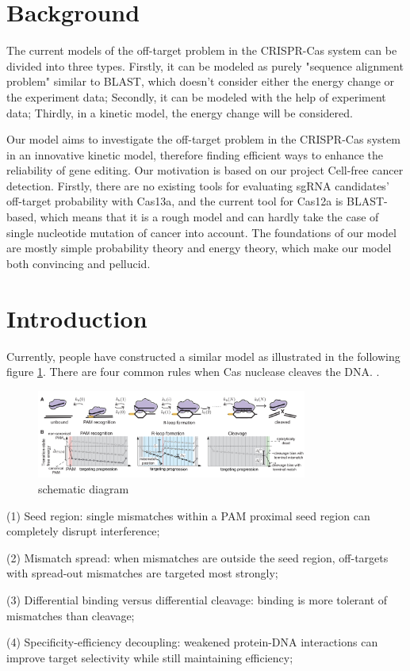 \section{Background}
The current models of the off-target problem in the CRISPR-Cas system can be divided into three types. Firstly, it can be modeled as purely "sequence alignment problem" similar to BLAST, which doesn't consider either the energy change or the experiment data; Secondly, it can be modeled with the help of experiment data; Thirdly, in a kinetic model, the energy change will be considered. 

Our model aims to investigate the off-target problem in the CRISPR-Cas system in an innovative kinetic model, therefore finding efficient ways to enhance the reliability of gene editing. Our motivation is based on our project Cell-free cancer detection. Firstly, there are no existing tools for evaluating sgRNA candidates' off-target probability with Cas13a, and the current tool for Cas12a is BLAST-based, which means that it is a rough model and can hardly take the case of single nucleotide mutation of cancer into account. The foundations of our model are mostly simple probability theory and energy theory, which make our model both convincing and pellucid.

\section{Introduction}
Currently, people have constructed a similar model as illustrated in the following figure \ref{fig:1}. There are four common rules when Cas nuclease cleaves the DNA\cite{klein2018hybridization}.
	.
\begin{figure}[tbph]
\centering
\includegraphics[width=3.5in]{1}
\caption{schematic diagram}
\label{fig:1}
\end{figure}
	
(1) Seed region: single mismatches within a PAM proximal seed region can completely disrupt interference;\par
(2) Mismatch spread: when mismatches are outside the seed region, off-targets with spread-out mismatches are targeted most strongly;\par
(3) Differential binding versus differential cleavage: binding is more tolerant of mismatches than cleavage;\par 
(4) Specificity-efficiency decoupling: weakened protein-DNA interactions can improve target selectivity while still maintaining efficiency;\par

